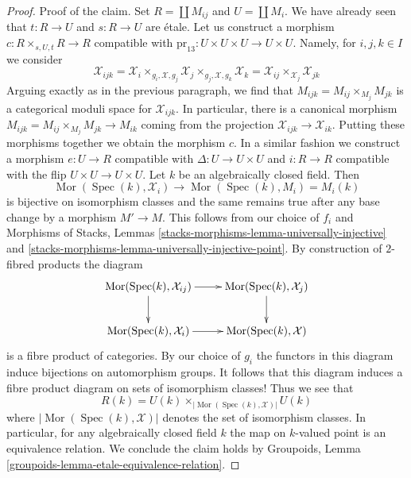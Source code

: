 \documentclass[10pt,a4paper]{amsart}
\theoremstyle{plain}
\theoremstyle{definition}
\theoremstyle{remark}
\numberwithin{equation}{subsection}
\def\Spec{\mathop{\mathrm{Spec}}}
\def\Mor{\mathop{\mathrm{Mor}}\nolimits}
\begin{document}
\begin{proof}
\medskip\noindent
Proof of the claim. Set $R = \coprod M_{ij}$ and $U = \coprod M_i$.
We have already seen that $t : R \to U$ and $s : R \to U$ are \'etale.
Let us construct a morphism $c : R \times_{s, U, t} R \to R$
compatible with $\text{pr}_{13} : U \times U \times U \to U \times U$.
Namely, for $i, j, k \in I$ we consider
$$
\mathcal{X}_{ijk} =
\mathcal{X}_i \times_{g_i, \mathcal{X}, g_j} \mathcal{X}_j
\times_{g_j, \mathcal{X}, g_k} \mathcal{X}_k =
\mathcal{X}_{ij} \times_{\mathcal{X}_j} \mathcal{X}_{jk}
$$
Arguing exactly as in the previous paragraph,
we find that $M_{ijk} = M_{ij} \times_{M_j} M_{jk}$
is a categorical moduli space for $\mathcal{X}_{ijk}$.
In particular, there is a canonical morphism
$M_{ijk} = M_{ij} \times_{M_j} M_{jk} \to M_{ik}$
coming from the projection $\mathcal{X}_{ijk} \to \mathcal{X}_{ik}$.
Putting these morphisms together we obtain the morphism $c$.
In a similar fashion we construct a morphism $e : U \to R$
compatible with $\Delta : U \to U \times U$ and
$i : R \to R$ compatible with the flip $U \times U \to U \times U$.
Let $k$ be an algebraically closed field. Then
$$
\Mor(\Spec(k), \mathcal{X}_i) \to \Mor(\Spec(k), M_i) = M_i(k)
$$
is bijective on isomorphism classes and the same remains true after any
base change by a morphism $M' \to M$. This follows from our choice
of $f_i$ and Morphisms of Stacks, Lemmas
\ref{stacks-morphisms-lemma-universally-injective} and
\ref{stacks-morphisms-lemma-universally-injective-point}.
By construction of $2$-fibred products the diagram
$$
\xymatrix{
\Mor(\Spec(k), \mathcal{X}_{ij}) \ar[d] \ar[r] &
\Mor(\Spec(k), \mathcal{X}_j) \ar[d] \\
\Mor(\Spec(k), \mathcal{X}_i) \ar[r] &
\Mor(\Spec(k), \mathcal{X})
}
$$
is a fibre product of categories. By our choice of $g_i$ the
functors in this diagram induce bijections on automorphism groups.
It follows that this diagram induces a fibre product diagram
on sets of isomorphism classes! Thus we see that
$$
R(k) = U(k) \times_{|\Mor(\Spec(k), \mathcal{X})|} U(k)
$$
where $|\Mor(\Spec(k), \mathcal{X})|$ denotes the set
of isomorphism classes.
In particular, for any algebraically closed field $k$
the map on $k$-valued point is an equivalence relation.
We conclude the claim holds by
Groupoids, Lemma \ref{groupoids-lemma-etale-equivalence-relation}.


\end{proof}
\end{document}
